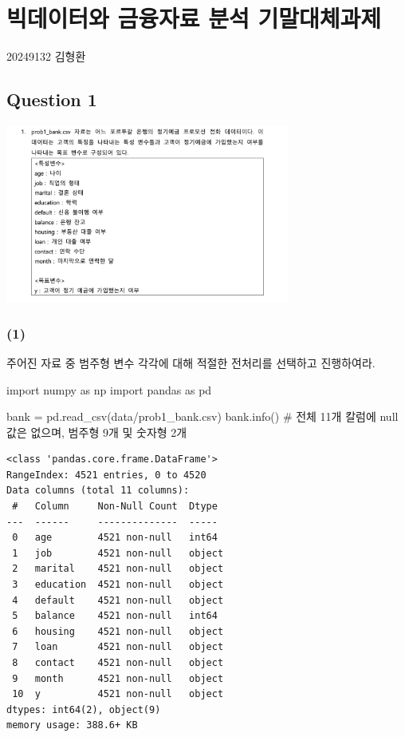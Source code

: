 \documentclass[
  a4paper,
  DIV=11,
  numbers=noendperiod]{scrreprt}
\newenvironment{Shaded}{\begin{snugshade}}{\end{snugshade}}
\newcommand{\CommentTok}[1]{\textcolor[rgb]{0.37,0.37,0.37}{#1}}
\newcommand{\ImportTok}[1]{\textcolor[rgb]{0.00,0.46,0.62}{#1}}
\newcommand{\NormalTok}[1]{\textcolor[rgb]{0.00,0.23,0.31}{#1}}
\newcommand{\OperatorTok}[1]{\textcolor[rgb]{0.37,0.37,0.37}{#1}}
\newcommand{\StringTok}[1]{\textcolor[rgb]{0.13,0.47,0.30}{#1}}
\begin{document}
\chapter{빅데이터와 금융자료 분석
기말대체과제}\label{uxbe45uxb370uxc774uxd130uxc640-uxae08uxc735uxc790uxb8cc-uxbd84uxc11d-uxae30uxb9d0uxb300uxccb4uxacfcuxc81c}

20249132 김형환

\section{Question 1}\label{question-1}

\begin{center}
\includegraphics[width=0.7\textwidth,height=\textheight]{image/bigdata1.png}
\end{center}

\subsection{(1)}\label{section}

주어진 자료 중 범주형 변수 각각에 대해 적절한 전처리를 선택하고
진행하여라.

\begin{Shaded}
\begin{Highlighting}[]
\ImportTok{import}\NormalTok{ numpy }\ImportTok{as}\NormalTok{ np}
\ImportTok{import}\NormalTok{ pandas }\ImportTok{as}\NormalTok{ pd}

\NormalTok{bank }\OperatorTok{=}\NormalTok{ pd.read\_csv(}\StringTok{\textquotesingle{}data/prob1\_bank.csv\textquotesingle{}}\NormalTok{)}
\NormalTok{bank.info() }\CommentTok{\# 전체 11개 칼럼에 null값은 없으며, 범주형 9개 및 숫자형 2개}
\end{Highlighting}
\end{Shaded}

\begin{verbatim}
<class 'pandas.core.frame.DataFrame'>
RangeIndex: 4521 entries, 0 to 4520
Data columns (total 11 columns):
 #   Column     Non-Null Count  Dtype 
---  ------     --------------  ----- 
 0   age        4521 non-null   int64 
 1   job        4521 non-null   object
 2   marital    4521 non-null   object
 3   education  4521 non-null   object
 4   default    4521 non-null   object
 5   balance    4521 non-null   int64 
 6   housing    4521 non-null   object
 7   loan       4521 non-null   object
 8   contact    4521 non-null   object
 9   month      4521 non-null   object
 10  y          4521 non-null   object
dtypes: int64(2), object(9)
memory usage: 388.6+ KB
\end{verbatim}
\end{document}
